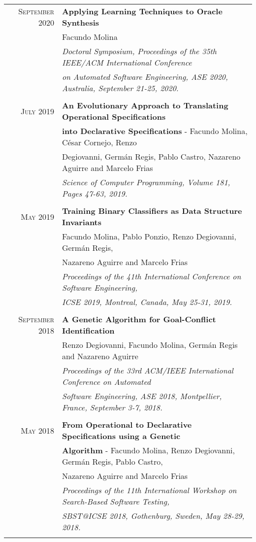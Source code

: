 \documentclass[a4paper,10pt]{article} %
\begin{document}
\begin{longtable}{rl}
\textsc{September} 2020  & \textbf{Applying Learning Techniques to Oracle Synthesis} \\
& Facundo Molina \\
& \textit{Doctoral Symposium, Proceedings of the 35th IEEE/ACM International Conference} \\
& \textit{on Automated Software Engineering, ASE 2020, Australia, September 21-25, 2020.} \\ & \\

\textsc{July} 2019  & \textbf{An Evolutionary Approach to Translating Operational Specifications} \\ & \textbf{into Declarative Specifications} - Facundo Molina, César Cornejo, Renzo\\ 
& Degiovanni, Germán Regis, Pablo Castro, Nazareno Aguirre and Marcelo Frias \\
& \textit{Science of Computer Programming, Volume 181, Pages 47-63, 2019.} \\ & \\

\textsc{May} 2019  & \textbf{Training Binary Classifiers as Data Structure Invariants} \\ 
& Facundo Molina, Pablo Ponzio, Renzo Degiovanni, Germán Regis, \\ 
& Nazareno Aguirre and Marcelo Frias \\
& \textit{Proceedings of the 41th International Conference on Software Engineering,} \\
& \textit{ICSE 2019, Montreal, Canada, May 25-31, 2019.} \\ & \\

\textsc{September} 2018  & \textbf{A Genetic Algorithm for Goal-Conflict Identification} \\ 
& Renzo Degiovanni, Facundo Molina, Germán Regis and Nazareno Aguirre \\
& \textit{Proceedings of the 33rd ACM/IEEE International Conference on Automated } \\
& \textit{Software Engineering, ASE 2018, Montpellier, France, September 3-7, 2018.} \\ & \\

\textsc{May} 2018  & \textbf{From Operational to Declarative Specifications using a Genetic} \\ & \textbf{Algorithm} - Facundo Molina, Renzo Degiovanni, Germán Regis, Pablo Castro,\\
& Nazareno Aguirre and Marcelo Frias \\
& \textit{Proceedings of the 11th International Workshop on Search-Based Software Testing,} \\
& \textit{SBST@ICSE 2018, Gothenburg, Sweden, May 28-29, 2018.} \\ & \\


\end{longtable}
\end{document}
